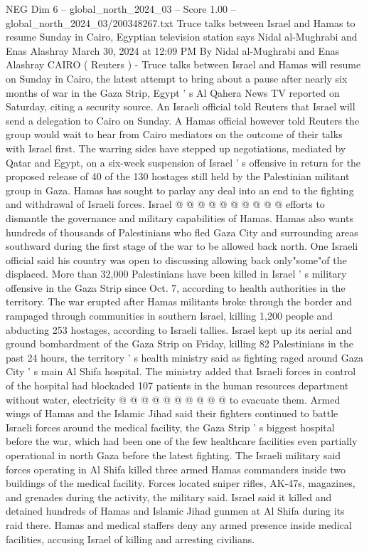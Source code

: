\begin{textsample}{NEG Dim 6 – global\_north\_2024\_03 – Score 1.00 – global\_north\_2024\_03/200348267.txt}  \label{ex:f6_neg_401}
Truce talks between Israel and Hamas to resume Sunday in Cairo, Egyptian television station says Nidal al-Mughrabi and Enas Alashray March 30, 2024 at 12:09 PM By Nidal al-Mughrabi and Enas Alashray CAIRO ( Reuters ) - Truce talks between Israel and Hamas will resume on Sunday in Cairo, the latest attempt to bring about a pause after nearly six months of war in the Gaza Strip, Egypt ' s Al Qahera News TV reported on Saturday, citing a security source.
An Israeli official told Reuters that Israel will send a delegation to Cairo on Sunday.
A Hamas official however told Reuters the group would wait to hear from Cairo mediators on the outcome of their talks with Israel first.
The warring sides have stepped up negotiations, mediated by Qatar and Egypt, on a six-week suspension of Israel ' s offensive in return for the proposed release of 40 of the 130 hostages still held by the Palestinian militant group in Gaza.
Hamas has sought to parlay any deal into an end to the fighting and withdrawal of Israeli forces.
Israel @ @ @ @ @ @ @ @ @ @ efforts to dismantle the governance and military capabilities of Hamas.
Hamas also wants hundreds of thousands of Palestinians who fled Gaza City and surrounding areas southward during the first stage of the war to be allowed back north.
One Israeli official said his country was open to discussing allowing back only"some"of the displaced.
More than 32,000 Palestinians have been killed in Israel ' s military offensive in the Gaza Strip since Oct. 7, according to health authorities in the territory.
The war erupted after Hamas militants broke through the border and rampaged through communities in southern Israel, killing 1,200 people and abducting 253 hostages, according to Israeli tallies.
Israel kept up its aerial and ground bombardment of the Gaza Strip on Friday, killing 82 Palestinians in the past 24 hours, the territory ' s health ministry said as fighting raged around Gaza City ' s main Al Shifa hospital.
The ministry added that Israeli forces in control of the hospital had blockaded 107 patients in the human resources department without water, electricity @ @ @ @ @ @ @ @ @ @ to evacuate them.
Armed wings of Hamas and the Islamic Jihad said their fighters continued to battle Israeli forces around the medical facility, the Gaza Strip ' s biggest hospital before the war, which had been one of the few healthcare facilities even partially operational in north Gaza before the latest fighting.
The Israeli military said forces operating in Al Shifa killed three armed Hamas commanders inside two buildings of the medical facility.
Forces located sniper rifles, AK-47s, magazines, and grenades during the activity, the military said.
Israel said it killed and detained hundreds of Hamas and Islamic Jihad gunmen at Al Shifa during its raid there.
Hamas and medical staffers deny any armed presence inside medical facilities, accusing Israel of killing and arresting civilians.

\end{textsample}

